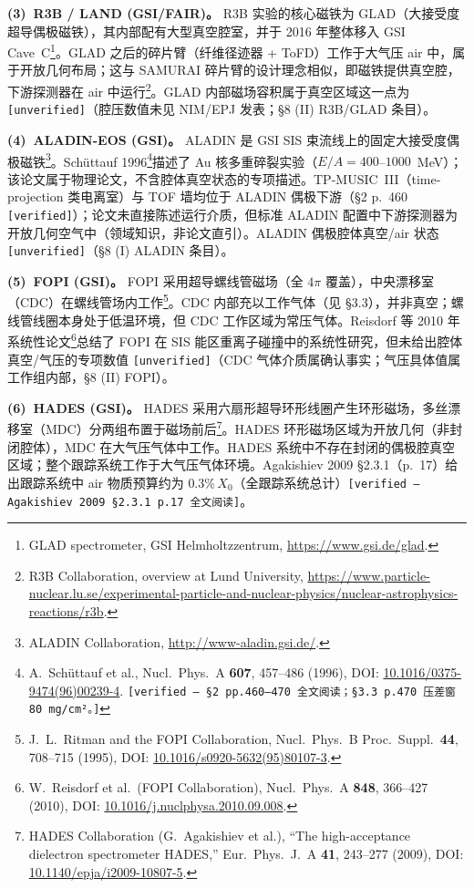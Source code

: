 \documentclass[a4paper, 11pt]{article}
\begin{document}
\textbf{(3)~R3B / LAND (GSI/FAIR)。}
R3B 实验的核心磁铁为 GLAD（大接受度超导偶极磁铁），其内部配有大型真空腔室，并于 2016 年整体移入 GSI Cave~C\footnote{\label{fn:glad}GLAD spectrometer, GSI Helmholtzzentrum, \url{https://www.gsi.de/glad}.}。GLAD 之后的碎片臂（纤维径迹器 + ToFD）工作于大气压 air 中，属于开放几何布局；这与 SAMURAI 碎片臂的设计理念相似，即磁铁提供真空腔，下游探测器在 air 中运行\footnote{\label{fn:r3b_overview}R3B Collaboration, overview at Lund University, \url{https://www.particle-nuclear.lu.se/experimental-particle-and-nuclear-physics/nuclear-astrophysics-reactions/r3b}.}。GLAD 内部磁场容积属于真空区域这一点为 \texttt{[unverified]}（腔压数值未见 NIM/EPJ 发表；§8 (II) R3B/GLAD 条目）。

\textbf{(4)~ALADIN-EOS (GSI)。}
ALADIN 是 GSI SIS 束流线上的固定大接受度偶极磁铁\footnote{\label{fn:aladin_web}ALADIN Collaboration, \url{http://www-aladin.gsi.de/}.}。Schüttauf 1996\footnote{\label{fn:schuttauf1996}A.~Schüttauf et al., Nucl.\ Phys.\ A \textbf{607}, 457--486 (1996), DOI: \href{https://doi.org/10.1016/0375-9474(96)00239-4}{10.1016/0375-9474(96)00239-4}. \texttt{[verified --- §2 pp.460--470 全文阅读；§3.3 p.470 压差窗 80~mg/cm²。]}}描述了 Au 核多重碎裂实验（$E/A = 400$--$1000$~MeV）；该论文属于物理论文，不含腔体真空状态的专项描述。TP-MUSIC~III（time-projection 类电离室）与 TOF 墙均位于 ALADIN 偶极下游（§2 p.~460 \texttt{[verified]}）；论文未直接陈述运行介质，但标准 ALADIN 配置中下游探测器为开放几何空气中（领域知识，非论文直引）。ALADIN 偶极腔体真空/air 状态 \texttt{[unverified]}（§8 (I) ALADIN 条目）。

\textbf{(5)~FOPI (GSI)。}
FOPI 采用超导螺线管磁场（全 $4\pi$ 覆盖），中央漂移室（CDC）在螺线管场内工作\footnote{\label{fn:ritman1995}J.~L.~Ritman and the FOPI Collaboration, Nucl.\ Phys.\ B Proc.\ Suppl.\ \textbf{44}, 708--715 (1995), DOI: \href{https://doi.org/10.1016/s0920-5632(95)80107-3}{10.1016/s0920-5632(95)80107-3}.}。CDC 内部充以工作气体（见 §3.3），并非真空；螺线管线圈本身处于低温环境，但 CDC 工作区域为常压气体。Reisdorf 等 2010 年系统性论文\footnote{\label{fn:reisdorf2010}W.~Reisdorf et al.\ (FOPI Collaboration), Nucl.\ Phys.\ A \textbf{848}, 366--427 (2010), DOI: \href{https://doi.org/10.1016/j.nuclphysa.2010.09.008}{10.1016/j.nuclphysa.2010.09.008}.}总结了 FOPI 在 SIS 能区重离子碰撞中的系统性研究，但未给出腔体真空/气压的专项数值 \texttt{[unverified]}（CDC 气体介质属确认事实；气压具体值属工作组内部，§8 (II) FOPI）。

\textbf{(6)~HADES (GSI)。}
HADES 采用六扇形超导环形线圈产生环形磁场，多丝漂移室（MDC）分两组布置于磁场前后\footnote{\label{fn:agakishiev2009}HADES Collaboration (G.~Agakishiev et al.), ``The high-acceptance dielectron spectrometer HADES,'' Eur.\ Phys.\ J.\ A \textbf{41}, 243--277 (2009), DOI: \href{https://doi.org/10.1140/epja/i2009-10807-5}{10.1140/epja/i2009-10807-5}.}。HADES 环形磁场区域为开放几何（非封闭腔体），MDC 在大气压气体中工作。HADES 系统中不存在封闭的偶极腔真空区域；整个跟踪系统工作于大气压气体环境。Agakishiev 2009 §2.3.1（p.~17）给出跟踪系统中 air 物质预算约为 $0.3\%\,X_0$（全跟踪系统总计）\texttt{[verified --- Agakishiev 2009 §2.3.1 p.17 全文阅读]}。
\end{document}
